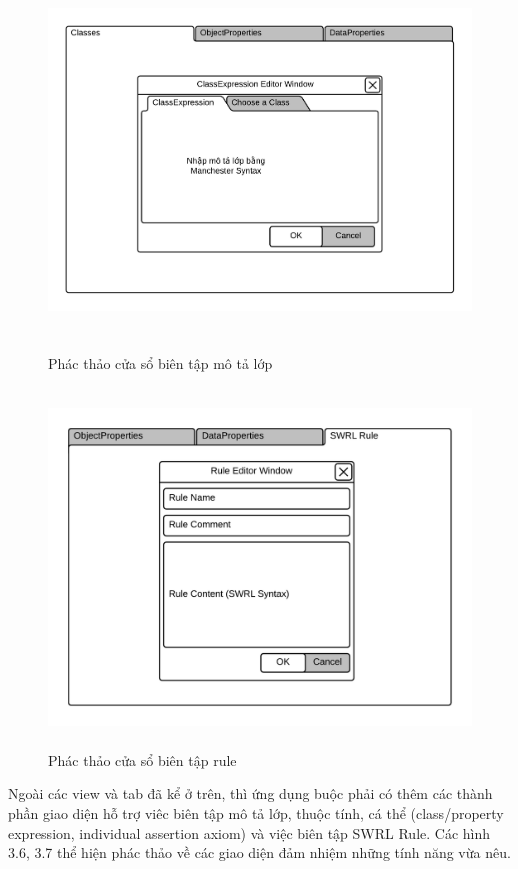 \begin{figure}[h!]
	\centering
	\includegraphics[width=150mm,height=100mm]{Figures/ui_classexpressioneditor.png}
	\caption{Phác thảo cửa sổ biên tập mô tả lớp\label{overflow}}
\end{figure}
\begin{figure}[h!]
	\centering
	\includegraphics[width=155mm,height=95mm]{Figures/ui_mainview_ruleeditor.png}
	\caption{Phác thảo cửa sổ biên tập rule \label{overflow}}
\end{figure}
Ngoài các view và tab đã kể ở trên, thì ứng dụng buộc phải có thêm các thành phần giao diện hỗ trợ viêc biên tập mô tả lớp, thuộc tính, cá thể (class/property expression, individual assertion axiom) và việc biên tập SWRL Rule. Các hình 3.6, 3.7  thể hiện phác thảo về các giao diện đảm nhiệm những tính năng vừa nêu.
